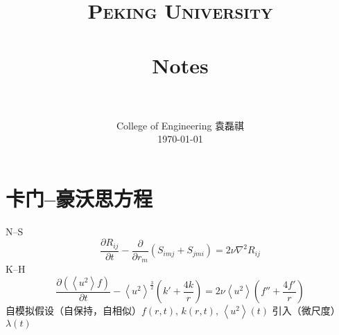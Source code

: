 \documentclass[12pt]{ctexart}
\title{
   \vspace{-1in} 	
   \usefont{OT1}{bch}{b}{n}
   \normalfont \normalsize \textsc{\LARGE Peking University}\\[1cm] %
   \horrule{0.5pt} \\[0.5cm]
   \huge \bfseries{Notes} \\
   \horrule{2pt} \\[0.5cm]
}
\author{
   \normalfont 								\normalsize
   College of Engineering \quad 2001111690  \quad 袁磊祺\\	\normalsize
   \today
}
\date{}
\begin{document}
% 

\maketitle

\section{卡门--豪沃思方程}


N--S 
\begin{equation}
   \frac{\partial R_{ij}}{\partial t} - \frac{\partial }{\partial r_m} \left( S_{imj} + S_{jmi} \right) = 2 \nu \nabla^2 R_{ij}
\end{equation}
K--H
\begin{equation}
   \frac{\partial \left( \left<	u^2 \right> f \right) }{\partial t}  - \left< u^2 \right> ^{\frac{3}{2}} \left( k' + \frac{4k}{r} \right) = 2 \nu \left< u^2 \right> \left( f'' + \frac{4f'}{r} \right) 
\end{equation}
自模拟假设（自保持，自相似）$f(r,t),\, k(r,t),\, \left<	u^2 \right>(t)$ 引入（微尺度）$\lambda(t)$ 
\end{document}
